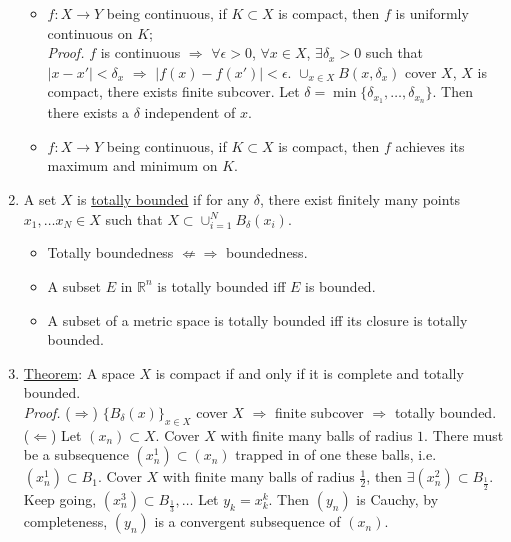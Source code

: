 \documentclass[%
 aip,
 jmp,%
 amsmath,amssymb,
 reprint,%
]{revtex4-1}
\def\R{{\mathbb R}}
\def\d{\delta}
\def\e{\epsilon}
\def\Ra{\Rightarrow}
\renewenvironment{proof}{\color{gray}\footnotesize\emph{Proof.}}{}
\newcommand{\defn}[1]{\underline{#1}}
\begin{document}
\begin{enumerate}
\begin{itemize}
            \item $f:X \to Y$ being continuous, if $K\subset X$ is compact,
                  then $f$ is uniformly continuous on $K$; \\
                \begin{proof}
                    $f$ is continuous $\Ra$ $\forall\e>0$, $\forall x\in X$,
                    $\exists\d_x >0$ such that $|x-x'|<\d_x$ $\Ra$ $|f(x)-f(x')|<\e$.
                    $\cup_{x\in X} B(x, \d_x)$ cover $X$, $X$ is compact,
                    there exists finite subcover. Let $\d = \min \{\d_{x_1}, \dots,
                    \d_{x_n}\}$. Then there exists a $\d$ independent of $x$.
                \end{proof}

            \item $f:X \to Y$ being continuous, if $K\subset X$ is compact,
                  then $f$ achieves its maximum and minimum on $K$.
        \end{itemize}

    \item A set $X$ is \defn{totally bounded} if for any $\d$, there exist finitely many
    points $x_1, \dots x_N \in X$ such that $X \subset \cup_{i=1}^N B_\d(x_i)$.
        \begin{itemize}
            \item Totally boundedness $\not\Leftarrow\Rightarrow$ boundedness.
            \item A subset $E$ in $\R^n$ is totally bounded iff $E$ is bounded.
            \item A subset of a metric space is totally bounded iff its closure
            is totally bounded.
        \end{itemize}

    \item \defn{Theorem}: A space $X$ is compact if and only if it is complete and
    totally bounded. \\
    \begin{proof}
    ($\Ra$) $\{B_{\d}(x)\}_{x\in X}$ cover $X$ $\Ra$ finite subcover $\Ra$ totally bounded.
    ($\Leftarrow$) Let $(x_n)\subset X$. Cover $X$ with finite many balls of radius $1$.
    There must be a subsequence $(x_n^1) \subset (x_n)$ trapped in of one these balls,
    i.e. $(x_n^1) \subset B_1$.
    Cover $X$ with finite many balls of radius $\frac{1}{2}$, then
    $\exists (x_n^2) \subset B_{\frac{1}{2}}$.
    Keep going, $(x_n^3) \subset B_{\frac{1}{3}}, \dots $
    Let $y_k = x_k^k$. Then $(y_n)$ is Cauchy, by completeness,
    $(y_n)$ is a convergent subsequence of $(x_n)$.
    \end{proof}


\end{enumerate}
\end{document}

